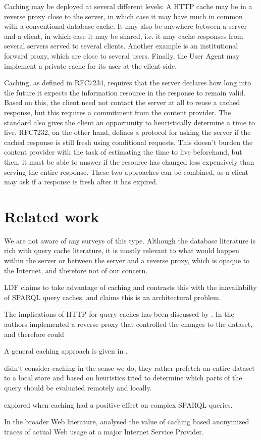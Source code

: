\documentclass{llncs}
\begin{document}
Caching may be deployed at several different levels: A HTTP cache may
be in a reverse proxy close to the server, in which case it may have
much in common with a conventional database cache. It may also be
anywhere between a server and a client, in which case it may be
shared, i.e. it may cache responses from several servers served to
several clients. Another example is an institutional forward proxy,
which are close to several users. Finally, the User Agent may
implement a private cache for its user at the client side.

Caching, as defined in RFC7234, requires that the server declares how
long into the future it expects the information resource in the
response to remain valid. Based on this, the client need not contact
the server at all to reuse a cached response, but this requires a
commitment from the content provider. The standard also gives the
client an opportunity to heuristically determine a time to
live. RFC7232, on the other hand, defines a protocol for asking the
server if the cached response is still fresh using conditional
requests. This doesn't burden the content provider with the task of
estimating the time to live beforehand, but then, it must be able to
answer if the resource has changed less expensively than serving the
entire response. These two approaches can be combined, as a client may
ask if a response is fresh after it has expired.

\section{Related work}

We are not aware of any surveys of this type. Although the database
literature is rich with query cache literature, it is mostly relevant
to what would happen within the server or between the server and a
reverse proxy, which is opaque to the Internet, and therefore not of
our concern.

LDF claims to take advantage of caching and contrasts
this with the inavailabilty of SPARQL query caches, and claims this is
an architectural problem.

The implications of HTTP for query caches has been discussed by
. In  the authors implemented a
reverse proxy that controlled the changes to the dataset, and
therefore could 

A general caching approach is given in . 

 didn't consider caching in the sense we do, they
rather prefetch an entire dataset to a local store and based on
heuristics tried to determine which parts of the query should be
evaluated remotely and locally.

 explored when caching had a positive effect on
complex SPARQL queries.

In the broader Web literature,  analysed the value of caching
based anonymized traces of actual Web usage at a major Internet
Service Provider.
\end{document}
